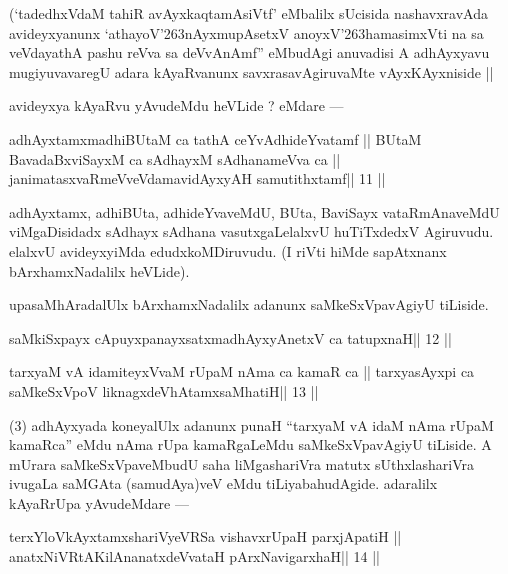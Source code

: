 \begin{artha}
(`tadedhxVdaM tahiR avAyxkaqtamAsiVtf' eMbalilx sUcisida nashavxravAda 
avideyxyanunx `athayoV\char'263nAyxmupAsetxV anoyxV\char'263hamasimxVti na sa veVdayathA pashu reVva sa deVvAnAmf'' eMbudAgi anuvadisi A adhAyx\-yavu mugiyuvavaregU adara kAyaRvanunx savxrasavAgiruvaMte vAyxKAyxniside ||
\end{artha} 
 
 
\begin{artha}
avideyxya kAyaRvu yAvudeMdu heVLide ? eMdare --- 
\end{artha}

\begin{shl}
adhAyxtamxmadhiBUtaM ca tathA ceYvAdhideYvatamf ||
BUtaM BavadaBxviSayxM ca sAdhayxM sAdhanameVva ca ||
janimatasxvaRmeVveVdamavidAyxyAH samutithxtamf\hfill || 11 ||
\end{shl}

\begin{artha}
adhAyxtamx, adhiBUta, adhideYvaveMdU, BUta, BaviSayx vataRmAnaveMdU 
viMgaDisidadx sAdhayx sAdhana vasutxgaLelalxvU huTiTxdedxV Agiruvudu. elalxvU avideyxyiMda edudxkoMDiruvudu. (I riVti hiMde sapAtxnanx bArxhamxNadalilx heVLide).
\end{artha} 
 
\begin{artha}
upasaMhAradalUlx bArxhamxNadalilx adanunx saMkeSxVpavAgiyU tiLiside.
\end{artha}

\begin{shl}
saMkiSxpayx cApuyxpanayxsatxmadhAyxyAnetxV ca tatupxnaH\hfill || 12 ||
\end{shl}

\begin{shl}
tarxyaM vA idamiteyxVvaM rUpaM nAma ca kamaR ca ||
tarxyasAyxpi ca saMkeSxVpoV liknagxdeVhAtamxsaMhatiH\hfill || 13 ||
\end{shl}

\begin{artha}
(3) adhAyxyada koneyalUlx adanunx punaH ``tarxyaM vA idaM nAma rUpaM 
kamaRca'' eMdu nAma rUpa kamaRgaLeMdu saMkeSxVpavAgiyU tiLiside. A mUrara saMkeSxVpaveMbudU saha liMgashariVra matutx sUthxlashariVra ivugaLa saMGAta (samudAya)veV eMdu tiLiyabahudAgide. adaralilx kAyaRrUpa yAvudeMdare ---
\end{artha}

\begin{shl}
terxYloVkAyxtamxshariVyeVRSa vishavxrUpaH parxjApatiH ||
anatxNiVRtAKilAnanatxdeVvataH pArxNavigarxhaH\hfill || 14 ||
\end{shl}

